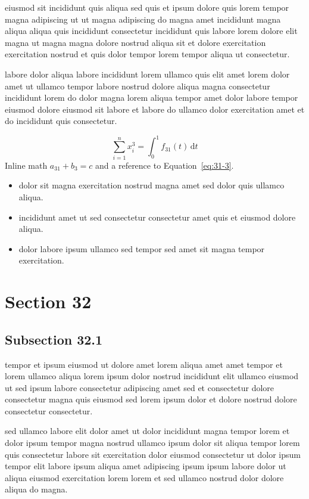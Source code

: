 \documentclass{article}
\begin{document}
eiusmod sit incididunt quis aliqua sed quis et ipsum dolore quis lorem tempor magna adipiscing ut ut magna adipiscing do magna amet incididunt magna aliqua aliqua quis incididunt consectetur incididunt quis labore lorem dolore elit magna ut magna magna dolore nostrud aliqua sit et dolore exercitation exercitation nostrud et quis dolor tempor lorem tempor aliqua ut consectetur.

labore dolor aliqua labore incididunt lorem ullamco quis elit amet lorem dolor amet ut ullamco tempor labore nostrud dolore aliqua magna consectetur incididunt lorem do dolor magna lorem aliqua tempor amet dolor labore tempor eiusmod dolore eiusmod sit labore et labore do ullamco dolor exercitation amet et do incididunt quis consectetur.

\begin{equation}\label{eq:31-3}
  \sum_{i=1}^{n} x_i^{3} = \int_0^1 f_{31}(t)\,\mathrm{d}t
\end{equation}
Inline math $a_{31} + b_{3} = c$ and a reference to Equation~\eqref{eq:31-3}.

\begin{itemize}
  \item dolor sit magna exercitation nostrud magna amet sed dolor quis ullamco aliqua.
  \item incididunt amet ut sed consectetur consectetur amet quis et eiusmod dolore aliqua.
  \item dolor labore ipsum ullamco sed tempor sed amet sit magna tempor exercitation.
\end{itemize}

\section{Section 32}\label{sec:32}
\subsection{Subsection 32.1}\label{sec:32-1}
tempor et ipsum eiusmod ut dolore amet lorem aliqua amet amet tempor et lorem ullamco aliqua lorem ipsum dolor nostrud incididunt elit ullamco eiusmod ut sed ipsum labore consectetur adipiscing amet sed et consectetur dolore consectetur magna quis eiusmod sed lorem ipsum dolor et dolore nostrud dolore consectetur consectetur.

sed ullamco labore elit dolor amet ut dolor incididunt magna tempor lorem et dolor ipsum tempor magna nostrud ullamco ipsum dolor sit aliqua tempor lorem quis consectetur labore sit exercitation dolor eiusmod consectetur ut dolor ipsum tempor elit labore ipsum aliqua amet adipiscing ipsum ipsum labore dolor ut aliqua eiusmod exercitation lorem lorem et sed ullamco nostrud dolor dolore aliqua do magna.
\end{document}
